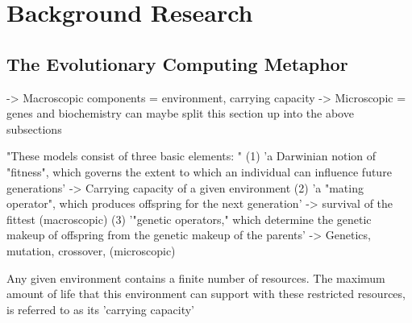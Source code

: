 
\chapter{Background Research} %

\label{Chapter2} %


\section{The Evolutionary Computing Metaphor}


-> Macroscopic components = environment, carrying capacity
-> Microscopic = genes and biochemistry
can maybe split this section up into the above subsections

"These models consist of three basic elements: " \cite{de1988learning}
(1) 'a Darwinian notion of "fitness", which governs the extent to which an individual can influence future generations' -> Carrying capacity of a given environment
(2) 'a "mating operator", which produces offspring for the next generation' -> survival of the fittest (macroscopic)
(3) '"genetic operators," which determine the genetic makeup of offspring from the genetic makeup of the parents' -> Genetics, mutation, crossover, (microscopic)

Any given environment contains a finite number of resources. The maximum amount of life that this environment can support with these restricted resources, is referred to as its 'carrying capacity' \cite{EibenSmith2003}

